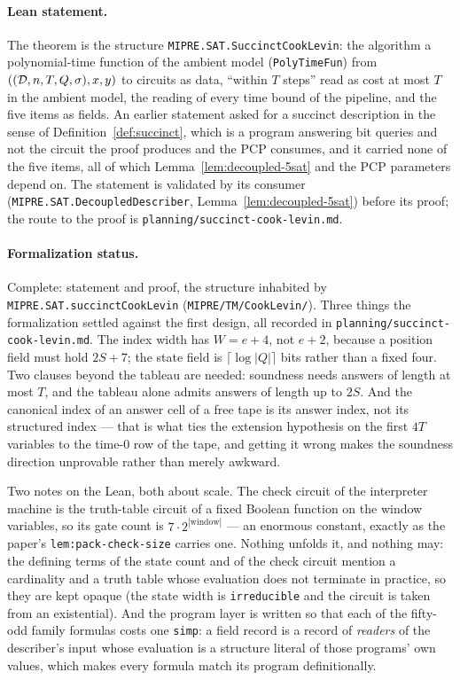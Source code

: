 \paragraph{Lean statement.} The theorem is the structure
\texttt{MIPRE.SAT.SuccinctCookLevin}: the algorithm a polynomial-time function of the
ambient model (\texttt{PolyTimeFun}) from $((\mathcal{D}, n, T, Q, \sigma), x, y)$ to circuits
as data, ``within $T$ steps'' read as cost at most $T$ in the ambient model, the reading of
every time bound of the pipeline, and the five items as fields. An earlier statement asked
for a succinct description in the sense of Definition~\ref{def:succinct}, which is a
program answering bit queries and not the circuit the proof produces and the PCP consumes,
and it carried none of the five items, all of which Lemma~\ref{lem:decoupled-5sat} and the
PCP parameters depend on. The statement is validated by its consumer
(\texttt{MIPRE.SAT.DecoupledDescriber}, Lemma~\ref{lem:decoupled-5sat}) before its proof;
the route to the proof is \texttt{planning/succinct-cook-levin.md}.

\paragraph{Formalization status.} Complete: statement and proof, the structure inhabited by
\texttt{MIPRE.SAT.succinctCookLevin} (\texttt{MIPRE/TM/CookLevin/}). Three things the
formalization settled against the first design, all recorded in
\texttt{planning/succinct-cook-levin.md}. The index width has $W = e + 4$, not $e + 2$,
because a position field must hold $2S + 7$; the state field is $\lceil \log |Q| \rceil$
bits rather than a fixed four. Two clauses beyond the tableau are needed: soundness needs
answers of length at most $T$, and the tableau alone admits answers of length up to $2S$.
And the canonical index of an answer cell of a free tape is its answer index, not its
structured index --- that is what ties the extension hypothesis on the first $4T$ variables
to the time-$0$ row of the tape, and getting it wrong makes the soundness direction
unprovable rather than merely awkward.

Two notes on the Lean, both about scale. The check circuit of the interpreter machine is the
truth-table circuit of a fixed Boolean function on the window variables, so its gate count is
$7 \cdot 2^{|\mathrm{window}|}$ --- an enormous constant, exactly as the paper's
\texttt{lem:pack-check-size} carries one. Nothing unfolds it, and nothing may: the defining
terms of the state count and of the check circuit mention a cardinality and a truth table
whose evaluation does not terminate in practice, so they are kept opaque (the state width is
\texttt{irreducible} and the circuit is taken from an existential). And the program layer is
written so that each of the fifty-odd family formulas costs one \texttt{simp}: a field record
is a record of \emph{readers} of the describer's input whose evaluation is a structure literal
of those programs' own values, which makes every formula match its program definitionally.

